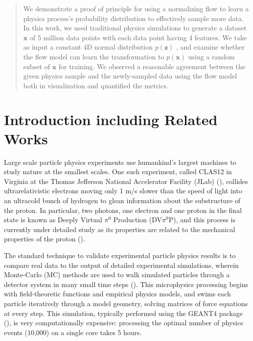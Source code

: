 \begin{abstract}
We demonstrate a proof of principle for using a normalizing flow to learn a physics process's probability distribution to effectively sample more data. In this work, we used traditional physics simulations to generate a dataset $\mathbf{x}$ of 5 million data points with each data point having 4 features.  We take as input a constant 4D normal distribution $p(\mathbf{z})$ , and examine whether the flow model can learn the transformation to $p(\mathbf{x})$ using a random subset of $\mathbf{x}$ for training. We observed a reasonable agreement between the given physics sample and the newly-sampled data using the flow model both in visualization and quantified the metrics.
\end{abstract}
\section{Introduction including Related Works }

Large scale particle physics experiments use humankind's largest machines to study nature at the smallest scales. One such experiment, called CLAS12 in Virginia at the Thomas Jefferson National Accelerator Facility (JLab) (\citet{BURKERT2020163419}), collides ultrarelativistic electrons moving only 1 m/s slower than the speed of light into an ultracold bunch of hydrogen to glean information about the substructure of the proton. In particular, two photons, one electron and one proton in the final state is known as Deeply Virtual $\pi^0$ Production (DV$\pi^0$P), and this process is currently under detailed study as its properties are related to the mechanical properties of the proton (\citet{PhysRevD.55.7114}).

The standard technique to validate experimental particle physics results is to compare real data to the output of detailed experimental simulations, wherein Monte-Carlo (MC) methods are used to walk simulated particles through a detector system in many small time steps (\citet{PhysRevLett.115.212003, 10.1093/ptep/ptaa104}). This microphysics processing begins with field-theoretic functions and empirical physics models, and swims each particle iteratively through a model geometry, solving matrices of force equations at every step. This simulation, typically performed using the GEANT4 package (\citet{AGOSTINELLI2003250}), is very computationally expensive: processing the optimal number of physics events (10,000) on a single core takes 5 hours. 

